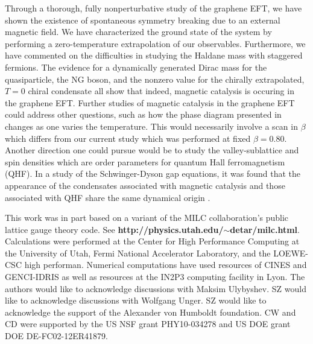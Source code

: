 \documentclass[aps,prd,twocolumn,showpacs,superscriptaddress,groupedaddress]{revtex4}  %
\begin{document}
Through a thorough, fully nonperturbative study of the graphene EFT, we have shown the existence of spontaneous symmetry breaking due to an external magnetic field.
We have characterized the ground state of the system by performing a zero-temperature extrapolation of our observables. Furthermore, we have commented on the difficulties in studying 
the Haldane mass with staggered fermions. The evidence for a dynamically generated Dirac mass for the quasiparticle, the NG boson, and the nonzero value for the chirally extrapolated, $T=0$ chiral condensate all show
that indeed, magnetic catalysis is occuring in the graphene EFT. Further studies of magnetic catalysis in the graphene EFT could address other questions, such as how the phase diagram presented in \cite{Polikarpov} changes as one varies the temperature.
This would necessarily involve a scan in $\beta$ which differs from our current study which was performed at fixed $\beta=0.80$. Another direction one could pursue would be to 
study the valley-sublattice and spin densities which are order parameters for quantum Hall ferromagnetism (QHF). In a study of the Schwinger-Dyson gap equations, it was found that 
the appearance of the condensates associated with magnetic catalysis and those associated with QHF share the same dynamical origin \cite{MiranskyGraphene2}.


\acknowledgements
This work was in part based on a variant of the MILC collaboration's public lattice gauge theory code. See {\bf http://physics.utah.edu/$\sim$detar/milc.html}.
Calculations were performed at the Center for High Performance Computing at the University of Utah, Fermi National Accelerator Laboratory, and the LOEWE-CSC high performan. Numerical computations have used resources of CINES and GENCI-IDRIS as well as resources at the IN2P3 computing facility in Lyon.
The authors would like to acknowledge discussions with Maksim Ulybyshev. SZ would like to acknowledge discussions with Wolfgang Unger.
SZ would like to acknowledge the support of the Alexander von Humboldt foundation. CW and CD were supported by the US NSF grant PHY10-034278 and US DOE grant DOE DE-FC02-12ER41879.

\appendix
\end{document}
